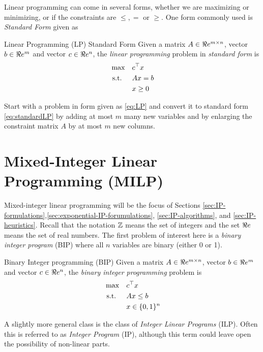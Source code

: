 Linear programming can come in several forms, whether we are maximizing or minimizing, or if the constraints are $\leq, =$ or $\geq$.   One form commonly used is \emph{Standard Form} given as 
\begin{general}{Linear Programming (LP) Standard Form}{\polynomial}
Given a matrix $A \in \Re e^{m\times n}$, vector $b \in \Re e^m$ and vector $c \in \Re e^n$, the \emph{linear programming} problem in \emph{standard form} is
\begin{equation}
\label{eq:standardLP}
\begin{split}
\max \quad & c^\top x\\
\mbox{ s.t. }  \quad & Ax = b\\
& x \geq 0
\end{split}
\end{equation}
\end{general}

\begin{exercise}
\label{exercise:LPconversion}
Start with a problem in form given as \eqref{eq:LP} and convert it to standard form \eqref{eq:standardLP} by adding at most $m$ many new variables and by enlarging the constraint matrix $A$ by at most $m$ new columns.
\end{exercise}
\section{Mixed-Integer Linear Programming (MILP)}
Mixed-integer linear programming will be the focus of Sections \ref{sec:IP-formulations},\ref{sec:exponential-IP-forumulations}, \ref{sec:IP-algorithms}, and \ref{sec:IP-heuristics}.
Recall that the notation ${\mathbb{Z}}$ means the set of integers and the set $\Re e$ means the set of real numbers.  The first problem of interest here is a \emph{binary integer program} (BIP) where all $n$ variables are binary (either 0 or 1).

\begin{general}{Binary Integer programming (BIP)}{\npcomplete}
Given a matrix $A \in \Re e^{m\times n}$, vector $b \in \Re e^m$ and vector $c \in \Re e^n$, the \emph{binary integer programming} problem is
\begin{equation}
\label{eq:BIP}
\begin{split}
\max \quad & c^\top x\\
\mbox{ s.t. }  \quad & Ax \leq b\\
& x \in \{0,1\}^n
\end{split}
\end{equation}
\end{general}
A slightly more general class is the class of \emph{Integer Linear Programs} (ILP).  Often this is referred to as \emph{Integer Program} (IP), although this term could leave open the possibility of non-linear parts.


